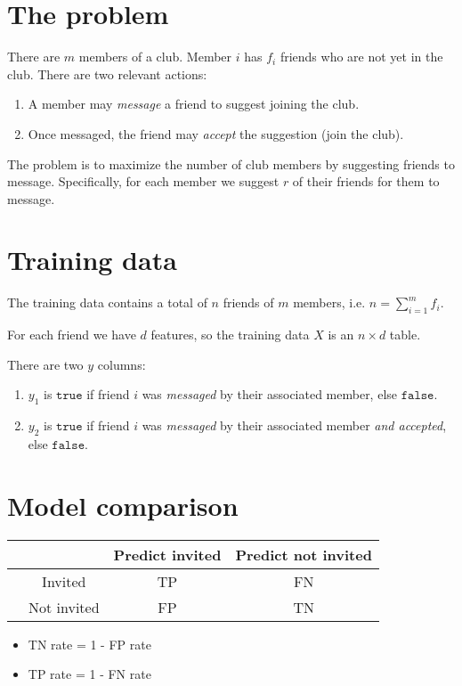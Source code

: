 \documentclass[12pt]{article}
\newcommand{\true}{\texttt{true}}
\newcommand{\false}{\texttt{false}}
\begin{document}
\section*{The problem}
There are $m$ members of a club. Member $i$ has $f_i$ friends who are not yet in the club. There
are two relevant actions:
\begin{enumerate}
\item A member may {\it message} a friend to suggest joining the club.
\item Once messaged, the friend may {\it accept} the suggestion (join the club).
\end{enumerate}
The problem is to maximize the number of club members by suggesting friends to
message. Specifically, for each member we suggest $r$ of their friends for them to message.

\section*{Training data}

The training data contains a total of $n$ friends of $m$ members, i.e. $n = \sum_{i=1}^m f_i$.

For each friend we have $d$ features, so the training data $X$ is an $n \times d$ table.

There are two $y$ columns:
\begin{enumerate}
\item $y_1$ is $\true$ if friend $i$ was {\it messaged} by their associated member, else $\false$.
\item $y_2$ is $\true$ if friend $i$ was {\it messaged} by their associated member {\it and
    accepted}, else $\false$.
\end{enumerate}


\newpage
\section*{Model comparison}

\begin{tabular}{c|c|c|c|}
  &             &Predict invited  &Predict not invited\\
  \hline
  &Invited      &TP               &FN\\
  &Not invited  &FP               &TN
\end{tabular}

\begin{itemize}
\item TN rate = 1 - FP rate
\item TP rate = 1 - FN rate
\end{itemize}
\end{document}
